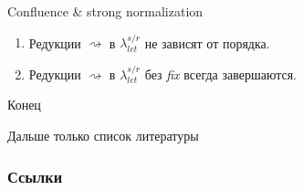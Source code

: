 \documentclass{beamer}
\begin{document}
\begin{frame}[fragile]{}
\begin{block}{Confluence \& strong normalization}
\begin{enumerate}
 \item Редукции $\rightsquigarrow$ в $\lambda_{let}^{s/r}$ не зависят от порядка.
 \item Редукции $\rightsquigarrow$ в $\lambda_{let}^{s/r}$ без \emph{fix} всегда завершаются.
\end{enumerate}
\end{block}
\end{frame}


\begin{frame}[fragile]{}
\begin{center}
{\Huge Конец}
\vspace{0.5cm}

Дальше только список литературы
\end{center}

\end{frame}



\begin{frame}[allowframebreaks]
        \frametitle{Ссылки}
        
        
\end{frame}
\end{document}
